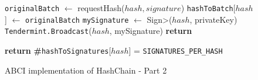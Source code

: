   \begin{figure}[t!]
  \begin{adjustbox}{minipage=[t]{\columnwidth}}
    \begin{algorithm}[H]
      \renewcommand{\thealgorithm}{Current Epoch Consolidation - Part 2}         
      \caption{\small ABCI implementation of HashChain - Part 2}%
      \label{alg:abci-hash2}%
      \small
      \begin{algorithmic}[1]
            	\label{alg:hash_revert}
                \State \texttt{originalBatch} $\leftarrow$ requestHash($hash, signature$)
					\State \texttt{hashToBatch}[$hash$]  $\leftarrow$ \texttt{originalBatch}     
                			\State \texttt{mySignature} $\leftarrow$ \<Sign>($hash$, privateKey)
                			\State \texttt{Tendermint.Broadcast}($hash$, mySignature)
					\EndIf   
				\EndIf             	
                	\State \textbf{return}
            \EndFunction
            
             \label{alg:hash_consolidated}
            		\State \textbf{return} \textbf{\#}\texttt{hashToSignatures}[$hash$] = \texttt{SIGNATURES\_PER\_HASH}
            \EndFunction

        \end{algorithmic}
      \end{algorithm}
	\end{adjustbox}
  \end{figure}
  
